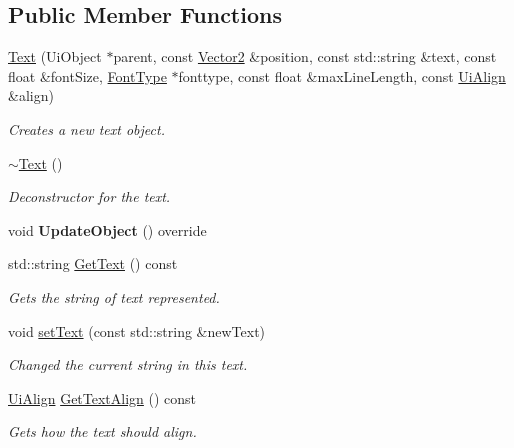 \subsection*{Public Member Functions}
\begin{DoxyCompactItemize}
\item 
\hyperlink{class_flounder_1_1_text_a4b3ea3bb7486f9add5958ddcfe77c1d2}{Text} (Ui\+Object $\ast$parent, const \hyperlink{class_flounder_1_1_vector2}{Vector2} \&position, const std\+::string \&text, const float \&font\+Size, \hyperlink{class_flounder_1_1_font_type}{Font\+Type} $\ast$fonttype, const float \&max\+Line\+Length, const \hyperlink{namespace_flounder_a561db2012ae4152be62bcd882407d361}{Ui\+Align} \&align)
\begin{DoxyCompactList}\small\item\em Creates a new text object. \end{DoxyCompactList}\item 
\hyperlink{class_flounder_1_1_text_a7c76c793a64d87b8e1bbe46d0ad3895d}{$\sim$\+Text} ()
\begin{DoxyCompactList}\small\item\em Deconstructor for the text. \end{DoxyCompactList}\item 
\mbox{\label{class_flounder_1_1_text_acc515acb8dc01062f440b98d8832b75e}} 
void {\bfseries Update\+Object} () override
\item 
std\+::string \hyperlink{class_flounder_1_1_text_ac674d336e2a4f44959492f9a5c01acf1}{Get\+Text} () const
\begin{DoxyCompactList}\small\item\em Gets the string of text represented. \end{DoxyCompactList}\item 
void \hyperlink{class_flounder_1_1_text_a88aeeebb9d93dce75c8ffd7142a3a2cd}{set\+Text} (const std\+::string \&new\+Text)
\begin{DoxyCompactList}\small\item\em Changed the current string in this text. \end{DoxyCompactList}\item 
\hyperlink{namespace_flounder_a561db2012ae4152be62bcd882407d361}{Ui\+Align} \hyperlink{class_flounder_1_1_text_a91dba4cff619b092bb9c05f76cf7885b}{Get\+Text\+Align} () const
\begin{DoxyCompactList}\small\item\em Gets how the text should align. \end{DoxyCompactList}\item 

\end{DoxyCompactItemize}

